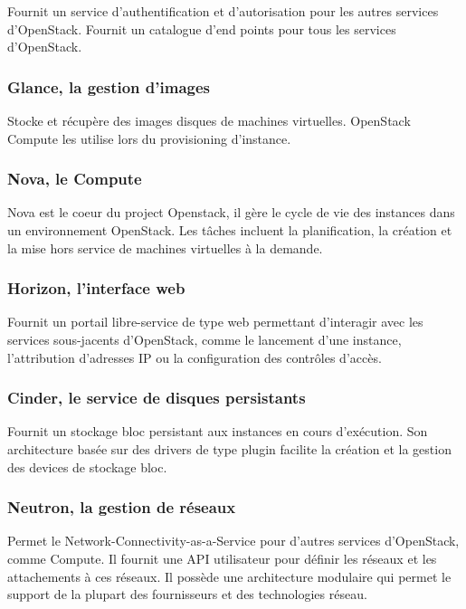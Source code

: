 \documentclass[]{article}
\begin{document}
Fournit un service d'authentification et d'autorisation pour les autres
services d'OpenStack. Fournit un catalogue d'end points pour tous les
services d'OpenStack.

\subsubsection{Glance, la gestion
d'images}\label{glance-la-gestion-dimages}

Stocke et récupère des images disques de machines virtuelles. OpenStack
Compute les utilise lors du provisioning d'instance.

\subsubsection{Nova, le Compute}\label{nova-le-compute}

Nova est le coeur du project Openstack, il gère le cycle de vie des
instances dans un environnement OpenStack. Les tâches incluent la
planification, la création et la mise hors service de machines
virtuelles à la demande.

\subsubsection{Horizon, l'interface web}\label{horizon-linterface-web}

Fournit un portail libre-service de type web permettant d'interagir avec
les services sous-jacents d'OpenStack, comme le lancement d'une
instance, l'attribution d'adresses IP ou la configuration des contrôles
d'accès.

\subsubsection{Cinder, le service de disques
persistants}\label{cinder-le-service-de-disques-persistants}

Fournit un stockage bloc persistant aux instances en cours d'exécution.
Son architecture basée sur des drivers de type plugin facilite la
création et la gestion des devices de stockage bloc.

\subsubsection{Neutron, la gestion de
réseaux}\label{neutron-la-gestion-de-ruxe9seaux}

Permet le Network-Connectivity-as-a-Service pour d'autres services
d'OpenStack, comme Compute. Il fournit une API utilisateur pour définir
les réseaux et les attachements à ces réseaux. Il possède une
architecture modulaire qui permet le support de la plupart des
fournisseurs et des technologies réseau.
\end{document}
